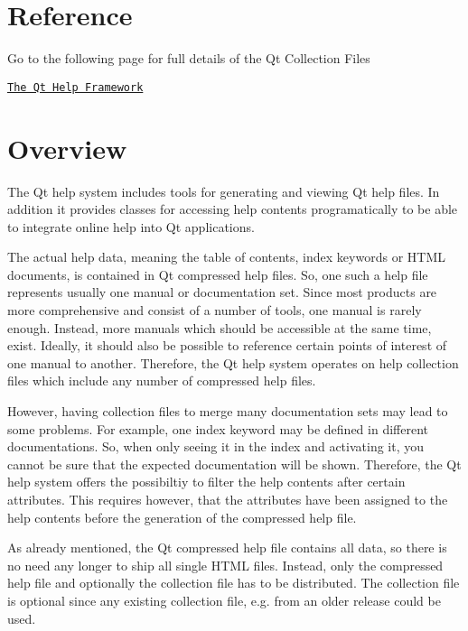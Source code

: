 \hypertarget{collection_collection_reference}{}\section{Reference}\label{collection_collection_reference}
Go to the following page for full details of the Qt Collection Files

\href{*http://qt-project.org/doc/qt-4.8/qthelp-framework.html#creating-a-qt-help-collection}{\tt The Qt Help Framework}\hypertarget{collection_colection_overview}{}\section{Overview}\label{collection_colection_overview}
The Qt help system includes tools for generating and viewing Qt help files. In addition it provides classes for accessing help contents programatically to be able to integrate online help into Qt applications.

The actual help data, meaning the table of contents, index keywords or H\-T\-M\-L documents, is contained in Qt compressed help files. So, one such a help file represents usually one manual or documentation set. Since most products are more comprehensive and consist of a number of tools, one manual is rarely enough. Instead, more manuals which should be accessible at the same time, exist. Ideally, it should also be possible to reference certain points of interest of one manual to another. Therefore, the Qt help system operates on help collection files which include any number of compressed help files.

However, having collection files to merge many documentation sets may lead to some problems. For example, one index keyword may be defined in different documentations. So, when only seeing it in the index and activating it, you cannot be sure that the expected documentation will be shown. Therefore, the Qt help system offers the possibiltiy to filter the help contents after certain attributes. This requires however, that the attributes have been assigned to the help contents before the generation of the compressed help file.

As already mentioned, the Qt compressed help file contains all data, so there is no need any longer to ship all single H\-T\-M\-L files. Instead, only the compressed help file and optionally the collection file has to be distributed. The collection file is optional since any existing collection file, e.\-g. from an older release could be used.

